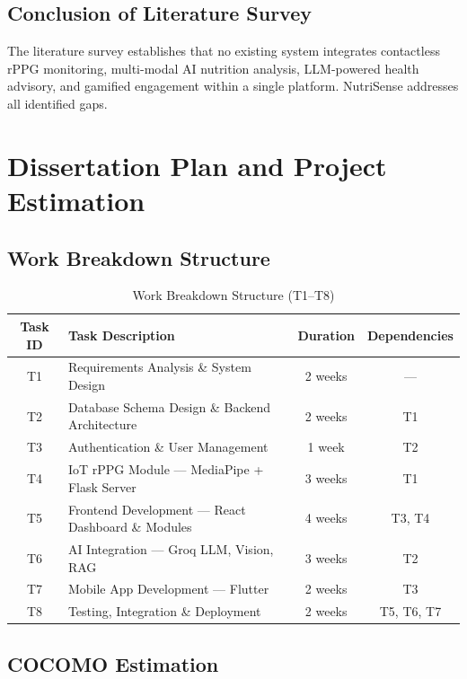 \documentclass[12pt,a4paper]{report}
\begin{document}
\section{Conclusion of Literature Survey}
The literature survey establishes that no existing system integrates contactless rPPG monitoring, multi-modal AI nutrition analysis, LLM-powered health advisory, and gamified engagement within a single platform. NutriSense addresses all identified gaps.

\chapter{Dissertation Plan and Project Estimation}

\section{Work Breakdown Structure}

\begin{table}[H]
\centering
\caption{Work Breakdown Structure (T1--T8)}
\label{tab:wbs}
\begin{tabular}{|c|p{8cm}|c|c|}
\hline
\textbf{Task ID} & \textbf{Task Description} & \textbf{Duration} & \textbf{Dependencies} \\
\hline
T1 & Requirements Analysis \& System Design & 2 weeks & --- \\
T2 & Database Schema Design \& Backend Architecture & 2 weeks & T1 \\
T3 & Authentication \& User Management & 1 week & T2 \\
T4 & IoT rPPG Module --- MediaPipe + Flask Server & 3 weeks & T1 \\
T5 & Frontend Development --- React Dashboard \& Modules & 4 weeks & T3, T4 \\
T6 & AI Integration --- Groq LLM, Vision, RAG & 3 weeks & T2 \\
T7 & Mobile App Development --- Flutter & 2 weeks & T3 \\
T8 & Testing, Integration \& Deployment & 2 weeks & T5, T6, T7 \\
\hline
\end{tabular}
\end{table}

\section{COCOMO Estimation}
\end{document}
